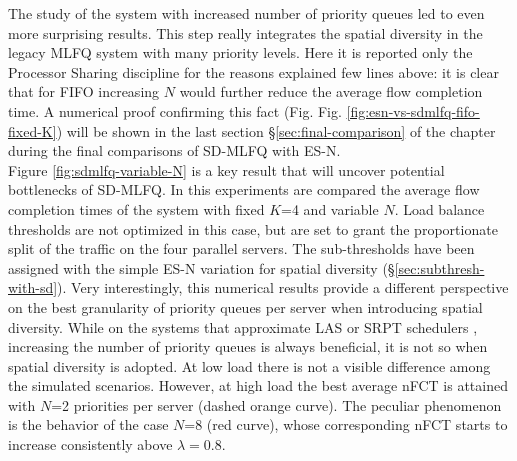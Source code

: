 The study of the system with increased number of priority queues led to even more surprising results. This step really integrates the spatial diversity in the legacy MLFQ system with many priority levels. Here it is reported only the Processor Sharing discipline for the reasons explained few lines above: it is clear that for FIFO increasing $N$ would further reduce the average flow completion time. A numerical proof confirming this fact (Fig. Fig. \ref{fig:esn-vs-sdmlfq-fifo-fixed-K}) will be shown in the last section \S \ref{sec:final-comparison} of the chapter during the final comparisons of SD-MLFQ with ES-N. \\
Figure \ref{fig:sdmlfq-variable-N} is a key result that will uncover potential bottlenecks of SD-MLFQ. In this experiments are compared the average flow completion times of the system with fixed $K$=4 and variable $N$. Load balance thresholds are not optimized in this case, but are set to grant the proportionate split of the traffic on the four parallel servers. The sub-thresholds have been assigned with the simple ES-N variation for spatial diversity (\S \ref{sec:subthresh-with-sd}). Very interestingly, this numerical results provide a different perspective on the best granularity of priority queues per server when introducing spatial diversity. While on the systems that approximate LAS or SRPT schedulers \cite{pias, pFabric}, increasing the number of priority queues is always beneficial, it is not so when spatial diversity is adopted. At low load there is not a visible difference among the simulated scenarios. However, at high load the best average nFCT is attained with $N$=2 priorities per server (dashed orange curve). The peculiar phenomenon is the behavior of the case $N$=8 (red curve), whose corresponding nFCT starts to increase consistently above $\lambda=0.8$. 
